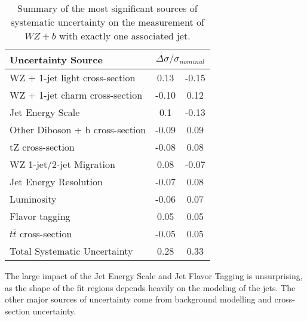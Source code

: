 \begin{table}[H]
    \centering
    \begin{tabular}{l|cc}
        \hline\hline
        Uncertainty Source & \multicolumn{2}{c}{$\Delta \sigma/\sigma_{nominal}$ }  \\
        \hline
        WZ + 1-jet light cross-section & 0.13 & -0.15 \\
        WZ + 1-jet charm cross-section & -0.10 & 0.12 \\
        Jet Energy Scale & 0.1 & -0.13 \\
        Other Diboson + b cross-section & -0.09 & 0.09 \\
        tZ cross-section & -0.08 & 0.08 \\
        WZ 1-jet/2-jet Migration & 0.08 & -0.07 \\
        Jet Energy Resolution & -0.07 & 0.08 \\
        Luminosity & -0.06 & 0.07 \\
        Flavor tagging & 0.05 & 0.05 \\
        $t\bar{t}$ cross-section & -0.05 & 0.05 \\
        \hline
        Total Systematic Uncertainty & 0.28 & 0.33 \\
        \hline\hline
    \end{tabular}
    \caption{Summary of the most significant sources of systematic uncertainty on the measurement of $WZ+b$ with exactly one associated jet.}
    \label{tab:systematics_1j}
\end{table}

The large impact of the Jet Energy Scale and Jet Flavor Tagging is unsurprising, as the shape of the fit regions depends heavily on the modeling of the jets. The other major sources of uncertainty come from background modelling and cross-section uncertainty. %



